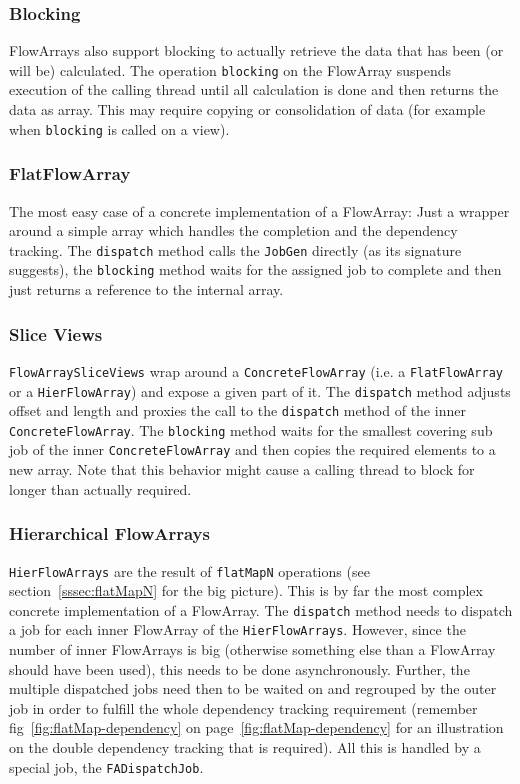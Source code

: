\documentclass[runningheads,a4paper,fleqn]{llncs}
\begin{document}
\subsubsection{Blocking}
FlowArrays also support blocking to actually retrieve the data that
has been (or will be) calculated. The operation \texttt{blocking} on
the FlowArray suspends execution of the calling thread until all
calculation is done and then returns the data as array. This may
require copying or consolidation of data (for example when
\texttt{blocking} is called on a view).

\subsubsection{FlatFlowArray}
The most easy case of a concrete implementation of a FlowArray: Just a
wrapper around a simple array which handles the completion and the
dependency tracking. The \texttt{dispatch} method calls the
\texttt{JobGen} directly (as its signature suggests), the
\texttt{blocking} method waits for the assigned job to complete and
then just returns a reference to the internal array.

\subsubsection{Slice Views}
\texttt{FlowArraySliceViews} wrap around a \texttt{ConcreteFlowArray}
(i.e. a \texttt{FlatFlowArray} or a \texttt{HierFlowArray})
and expose a given part of it. The \texttt{dispatch} method adjusts 
offset and length and proxies the call to the \texttt{dispatch} method
of the inner
\texttt{ConcreteFlowArray}. The \texttt{blocking} method waits for the
smallest covering sub job of the inner \texttt{ConcreteFlowArray} and
then copies the required elements to a new array. Note that this
behavior might cause a calling thread to block for longer than
actually required.

\subsubsection{Hierarchical FlowArrays}
\texttt{HierFlowArrays} are the result of \texttt{flatMapN} operations
(see section~\ref{sssec:flatMapN} for the big picture). This is by far
the most complex concrete implementation of a FlowArray. The
\texttt{dispatch} method needs to dispatch a job for each inner
FlowArray of the \texttt{HierFlowArrays}. However, since the number of
inner FlowArrays is big (otherwise something else than a FlowArray
should have been used), 
this needs to be done asynchronously. Further, the multiple dispatched
jobs need then to be waited on and regrouped by the outer job in order
to fulfill the whole dependency tracking requirement (remember
fig~\ref{fig:flatMap-dependency} on
page~\ref{fig:flatMap-dependency} for an illustration on the
double dependency tracking that is required). All this is handled by a 
special job, the \texttt{FADispatchJob}.
\end{document}
